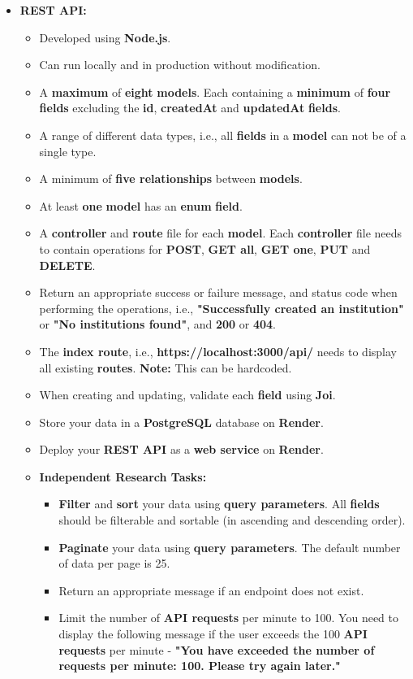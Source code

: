 \documentclass{article}
\begin{document}
\begin{itemize} 
	\item \textbf{REST API:}
	\begin{itemize}
		\item Developed using \textbf{Node.js}.
		\item Can run locally and in production without modification.
		\item A \textbf{maximum} of \textbf{eight} \textbf{models}. Each containing a \textbf{minimum} of \textbf{four} \textbf{fields} excluding the \textbf{id}, \textbf{createdAt} and \textbf{updatedAt} \textbf{fields}.
		\item A range of different data types, i.e., all \textbf{fields} in a \textbf{model} can not be of a single type.
		\item A minimum of \textbf{five relationships} between \textbf{models}.
		\item At least \textbf{one} \textbf{model} has an \textbf{enum} \textbf{field}. 
		\item A \textbf{controller} and \textbf{route} file for each \textbf{model}. Each \textbf{controller} file needs to contain operations for \textbf{POST}, \textbf{GET all}, \textbf{GET one}, \textbf{PUT} and \textbf{DELETE}.
		\item Return an appropriate success or failure message, and status code when performing the operations, i.e., \textbf{"Successfully created an institution"} or \textbf{"No institutions found"}, and \textbf{200} or \textbf{404}.
		\item The \textbf{index route}, i.e., \textbf{https://localhost:3000/api/} needs to display all existing \textbf{routes}. \textbf{Note:} This can be hardcoded.
		\item When creating and updating, validate each \textbf{field} using \textbf{Joi}. 
		\item Store your data in a \textbf{PostgreSQL} database on \textbf{Render}.
		\item Deploy your \textbf{REST API} as a \textbf{web service} on \textbf{Render}.
		\item \textbf{Independent Research Tasks:} 
		\begin{itemize}
			\item \textbf{Filter} and \textbf{sort} your data using \textbf{query parameters}. All \textbf{fields} should be filterable and sortable (in ascending and descending order).
			\item \textbf{Paginate} your data using \textbf{query parameters}. The default number of data per page is 25.
			\item Return an appropriate message if an endpoint does not exist.
			\item Limit the number of \textbf{API requests} per minute to 100. You need to display the following message if the user exceeds the 100 \textbf{API requests} per minute - \textbf{"You have exceeded the number of requests per minute: 100. Please try again later."}
		\end{itemize}
	\end{itemize}


\end{itemize}
\end{document}
